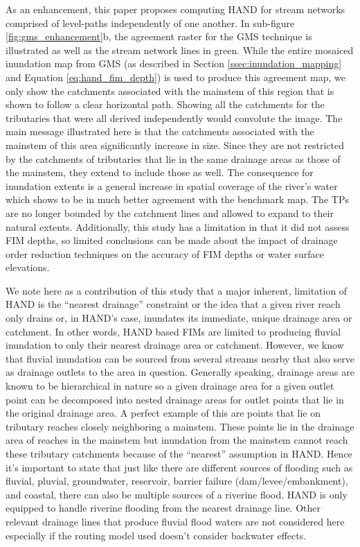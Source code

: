 \documentclass[draft]{dependencies/agujournal2019}
\begin{document}
As an enhancement, this paper proposes computing HAND for stream networks comprised of level-paths independently of one another.
In sub-figure \ref{fig:gms_enhancement}b, the agreement raster for the GMS technique is illustrated as well as the stream network lines in green.
While the entire mosaiced inundation map from GMS (as described in Section \ref{ssec:inundation_mapping} and Equation \ref{eq:hand_fim_depth}) is used to produce this agreement map, we only show the catchments associated with the mainstem of this region that is shown to follow a clear horizontal path.
Showing all the catchments for the tributaries that were all derived independently would convolute the image.
The main message illustrated here is that the catchments associated with the mainstem of this area significantly increase in size.
Since they are not restricted by the catchments of tributaries that lie in the same drainage areas as those of the mainstem, they extend to include those as well.
The consequence for inundation extents is a general increase in spatial coverage of the river's water which shows to be in much better agreement with the benchmark map.
The TPs are no longer bounded by the catchment lines and allowed to expand to their natural extents.
Additionally, this study has a limitation in that it did not assess FIM depths, so limited conclusions can be made about the impact of drainage order reduction techniques on the accuracy of FIM depths or water surface elevations.

We note here as a contribution of this study that a major inherent, limitation of HAND is the ``nearest drainage'' constraint or the idea that a given river reach only drains or, in HAND's case, inundates its immediate, unique drainage area or catchment.
In other words, HAND based FIMs are limited to producing fluvial inundation to only their nearest drainage area or catchment.
However, we know that fluvial inundation can be sourced from several streams nearby that also serve as drainage outlets to the area in question.
Generally speaking, drainage areas are known to be hierarchical in nature so a given drainage area for a given outlet point can be decomposed into nested drainage areas for outlet points that lie in the original drainage area.
A perfect example of this are points that lie on tributary reaches closely neighboring a mainstem.
These points lie in the drainage area of reaches in the mainstem but inundation from the mainstem cannot reach these tributary catchments because of the ``nearest'' assumption in HAND.
Hence it's important to state that just like there are different sources of flooding such as fluvial, pluvial, groundwater, reservoir, barrier failure (dam/levee/embankment), and coastal, there can also be multiple sources of a riverine flood.
HAND is only equipped to handle riverine flooding from the nearest drainage line.
Other relevant drainage lines that produce fluvial flood waters are not considered here especially if the routing model used doesn't consider backwater effects.
\end{document}
